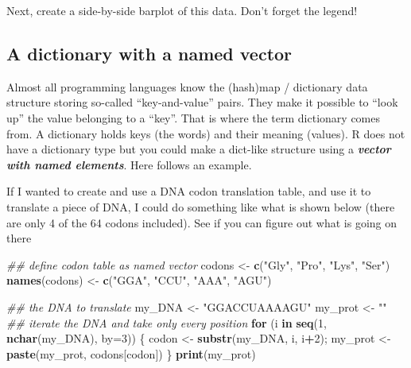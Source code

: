 \documentclass[]{book}
\newenvironment{Shaded}{\begin{snugshade}}{\end{snugshade}}
\newcommand{\CommentTok}[1]{\textcolor[rgb]{0.56,0.35,0.01}{\textit{#1}}}
\newcommand{\ControlFlowTok}[1]{\textcolor[rgb]{0.13,0.29,0.53}{\textbf{#1}}}
\newcommand{\DataTypeTok}[1]{\textcolor[rgb]{0.13,0.29,0.53}{#1}}
\newcommand{\DecValTok}[1]{\textcolor[rgb]{0.00,0.00,0.81}{#1}}
\newcommand{\KeywordTok}[1]{\textcolor[rgb]{0.13,0.29,0.53}{\textbf{#1}}}
\newcommand{\NormalTok}[1]{#1}
\newcommand{\OperatorTok}[1]{\textcolor[rgb]{0.81,0.36,0.00}{\textbf{#1}}}
\newcommand{\StringTok}[1]{\textcolor[rgb]{0.31,0.60,0.02}{#1}}
\begin{document}
Next, create a side-by-side barplot of this data. Don't forget the legend!

\hypertarget{a-dictionary-with-a-named-vector}{%
\subsection{A dictionary with a named vector}\label{a-dictionary-with-a-named-vector}}

Almost all programming languages know the (hash)map / dictionary data structure storing so-called ``key-and-value'' pairs. They make it possible to ``look up'' the value belonging to a ``key''. That is where the term dictionary comes from. A dictionary holds keys (the words) and their meaning (values). R does not have a dictionary type but you could make a dict-like structure using a \textbf{\emph{vector with named elements}}. Here follows an example.

If I wanted to create and use a DNA codon translation table, and use it to translate a piece of DNA, I could do something like what is shown below (there are only 4 of the 64 codons included). See if you can figure out what is going on there

\begin{Shaded}
\begin{Highlighting}[]
\CommentTok{## define codon table as named vector}
\NormalTok{codons <-}\StringTok{ }\KeywordTok{c}\NormalTok{(}\StringTok{"Gly"}\NormalTok{, }\StringTok{"Pro"}\NormalTok{, }\StringTok{"Lys"}\NormalTok{, }\StringTok{"Ser"}\NormalTok{)}
\KeywordTok{names}\NormalTok{(codons) <-}\StringTok{ }\KeywordTok{c}\NormalTok{(}\StringTok{"GGA"}\NormalTok{, }\StringTok{"CCU"}\NormalTok{, }\StringTok{"AAA"}\NormalTok{, }\StringTok{"AGU"}\NormalTok{)}

\CommentTok{## the DNA to translate}
\NormalTok{my_DNA <-}\StringTok{ "GGACCUAAAAGU"}
\NormalTok{my_prot <-}\StringTok{ ""}
\CommentTok{## iterate the DNA and take only every position}
\ControlFlowTok{for}\NormalTok{ (i }\ControlFlowTok{in} \KeywordTok{seq}\NormalTok{(}\DecValTok{1}\NormalTok{, }\KeywordTok{nchar}\NormalTok{(my_DNA), }\DataTypeTok{by=}\DecValTok{3}\NormalTok{)) \{}
\NormalTok{    codon <-}\StringTok{ }\KeywordTok{substr}\NormalTok{(my_DNA, i, i}\OperatorTok{+}\DecValTok{2}\NormalTok{);}
\NormalTok{    my_prot <-}\StringTok{ }\KeywordTok{paste}\NormalTok{(my_prot, codons[codon])}
\NormalTok{\}}
\KeywordTok{print}\NormalTok{(my_prot)}
\end{Highlighting}
\end{Shaded}
\end{document}
